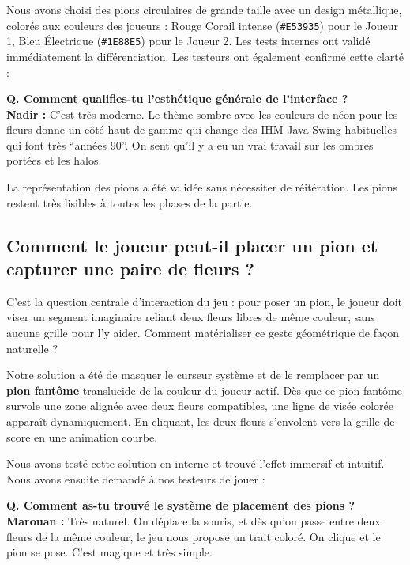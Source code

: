 \documentclass[11pt,a4paper]{article}
\begin{document}
Nous avons choisi des pions circulaires de grande taille avec un design métallique, colorés aux couleurs des joueurs : Rouge Corail intense (\texttt{\#E53935}) pour le Joueur 1, Bleu Électrique (\texttt{\#1E88E5}) pour le Joueur 2. Les tests internes ont validé immédiatement la différenciation. Les testeurs ont également confirmé cette clarté :

\begin{tcolorbox}[gamerbox, title={Nadir -- 22 ans, joueur de jeux de cartes en ligne}]
    \textbf{Q. Comment qualifies-tu l'esthétique générale de l'interface ?}\\
    \textbf{Nadir :} C'est très moderne. Le thème sombre avec les couleurs de néon pour les fleurs donne un côté haut de gamme qui change des IHM Java Swing habituelles qui font très ``années 90''. On sent qu'il y a eu un vrai travail sur les ombres portées et les halos.
\end{tcolorbox}

La représentation des pions a été validée sans nécessiter de réitération. Les pions restent très lisibles à toutes les phases de la partie.

\subsection{Comment le joueur peut-il placer un pion et capturer une paire de fleurs ?}

C'est la question centrale d'interaction du jeu : pour poser un pion, le joueur doit viser un segment imaginaire reliant deux fleurs libres de même couleur, sans aucune grille pour l'y aider. Comment matérialiser ce geste géométrique de façon naturelle ?

Notre solution a été de masquer le curseur système et de le remplacer par un \textbf{pion fantôme} translucide de la couleur du joueur actif. Dès que ce pion fantôme survole une zone alignée avec deux fleurs compatibles, une ligne de visée colorée apparaît dynamiquement. En cliquant, les deux fleurs s'envolent vers la grille de score en une animation courbe.

Nous avons testé cette solution en interne et trouvé l'effet immersif et intuitif. Nous avons ensuite demandé à nos testeurs de jouer :

\begin{tcolorbox}[nongamerbox, title={Marouan -- 25 ans, étudiant en lettres}]
    \textbf{Q. Comment as-tu trouvé le système de placement des pions ?}\\
    \textbf{Marouan :} Très naturel. On déplace la souris, et dès qu'on passe entre deux fleurs de la même couleur, le jeu nous propose un trait coloré. On clique et le pion se pose. C'est magique et très simple.
\end{tcolorbox}
\end{document}
